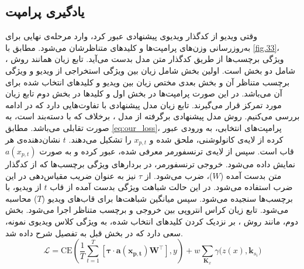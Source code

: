 \subsection{یادگیری پرامپت}
وقتی ویدیو از کدگذار ویدیوی پیشنهادی عبور کرد، وارد مرحله‌ی نهایی برای به‌روزرسانی وزن‌های پرامپت‌ها و کلید‌های متناظرشان می‌شود. مطابق با \cref{fig.33}، ویژگی برچسب‌ها از طریق کدگذار متن مدل  بدست می‌آید. تابع زیان همانند روش ، شامل دو بخش است. اولین بخش شامل زیان بین ویژگی استخراجی از ویدیو و ویژگی برچسب متناظر آن و بخش بعدی مختص زیان بین ویدیو و کلیدهای انتخاب شده برای آن می‌باشد. در این صورت پرامپت‌ها در بخش اول و کلیدها در بخش دوم تابع زیان مورد تمرکز قرار می‌گیرند. تابع زیان مدل پیشنهادی با  تفاوت‌هایی دارد که در ادامه بررسی می‌کنیم. روش مدل پیشنهادی برگرفته از مدل ، برخلاف  که با دسته‌بند است، به صورت تقابلی می‌باشد. مطابق \eqref{eq:our_loss}، پرامپت‌های انتخابی، به ورودی عبور کرده از لایه‌ی کانولوشنی، ملحق شده و $x_{p,t}$ را تشکیل می‌دهند. $t$ نشان‌دهنده‌ی هر قاب است. سپس از لایه‌ی ترنسفورمر معرفی شده، عبور کرده و به صورت $a(x_{p,t})$ نمایش داده می‌شود. خروجی ترنسفورمر، در بردارهای ویژگی برچسب‌ها که از کدگذار متن بدست آمده ($W$)، ضرب می‌شود. از $\tau$ نیز به عنوان ضریب مقیاس‌دهی در این ضرب استفاده می‌شود. در این حالت شباهت ویژگی بدست آمده از قاب $t$ از ویدیو، با برچسب‌ها سنجیده می‌شود. سپس میانگین شباهت‌ها برای قاب‌های ویدیو ($T$) محاسبه می‌شود. تابع زیان کراس انتروپی بین خروجی و برچسب‌ متناظر اجرا می‌شود. بخش دوم، مانند روش ، بر نزدیک کردن کلیدهای انتخاب شده، به ویژگی کلاس ویدیوی نمونه، سعی دارد که در بخش قبل به تفصیل شرح داده شد.
\begin{equation}\label{eq:our_loss}
	\mathcal{L} = \mathrm{CE} \left( 
	\frac{1}{T} \sum_{t=1}^{T} 
	\left[ 
	\mathbf{\tau \cdot a(x_{p,t})} \mathbf{W}^{\top} 
	\right], 
	y 
	\right) 
	+ w \sum_{\mathbf{K}_x} \gamma \big( z(x), \mathbf{k}_{s_i} \big)
\end{equation}

